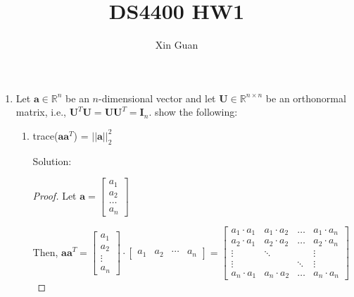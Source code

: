 \documentclass[12pt]{article}
\title{DS4400 HW1}
\date{}
\author{Xin Guan}
\newcommand{\solu}{{\color{blue} Solution:}}
\newcommand{\Rbb}{\mathbb{R}}
\newcommand{\Upmb}{\pmb{U}}
\newcommand{\Ipmb}{\mathbf{I}}
\begin{document}
\maketitle
\begin{enumerate}
    \item Let $\pmb{a} \in \Rbb^n$ be an $n$-dimensional vector and let $\Upmb \in \Rbb^{n \times n}$ be an orthonormal matrix, i.e., $\Upmb^{T} \Upmb = \Upmb \Upmb^{T} = \Ipmb_n$. show the following:
          \begin{enumerate}
              \item trace($\pmb{a}\pmb{a}^T$) = $||\pmb{a}||^2_2$

                    \solu
                    \begin{proof}
                        Let $\pmb{a} = \begin{bmatrix}
                            a_1 \\ 
                            a_2 \\
                            \dots \\ 
                            a_n
                        \end{bmatrix}$

                        Then,
                        $
                            \pmb{a}\pmb{a}^T=
                            \begin{bmatrix}
                                a_{1}  \\
                                a_{2}  \\
                                \vdots \\
                                a_{n}
                            \end{bmatrix} \cdot
                            \begin{bmatrix}
                                a_{1} & a_2 & \cdots & a_n
                            \end{bmatrix}
                            =
                            \begin{bmatrix}
                                a_1 \cdot a_1 & a_1 \cdot a_2 & \dots  & a_1 \cdot a_n \\
                                a_2 \cdot a_1 & a_2 \cdot a_2 & \dots  & a_2 \cdot a_n \\
                                \vdots        & \ddots        &        & \vdots        \\
                                \vdots        &               & \ddots & \vdots        \\
                                a_n \cdot a_1 & a_n \cdot a_2 & \dots  & a_n \cdot a_n
                            \end{bmatrix}
                        $


\end{proof}
\end{enumerate}
\end{enumerate}
\end{document}

